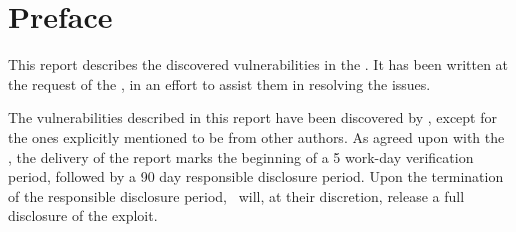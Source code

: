\chapter*{Preface}

This report describes the discovered vulnerabilities in the \product.
It has been written at the request of the \recipiants, in an effort to assist them in resolving the issues.

The vulnerabilities described in this report have been discovered by \Lyrebirds, except for the ones explicitly mentioned to be from other authors.
As agreed upon with the \recipiants, the delivery of the report marks the beginning of a 5 work-day verification period, followed by a 90 day responsible disclosure period.
Upon the termination of the responsible disclosure period, \Lyrebirds~will, at their discretion, release a full disclosure of the exploit.